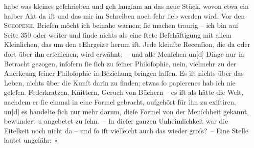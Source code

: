 \begin{ledgroupsized}[t]{13cm}
               habe was kleines geſchrieben
               und geh langſam an das neue Stück, wovon etwa ein halber Akt da iſt und das mir im Schreiben noch ſehr
               lieb werden wird.\pend
           \pstart
           {\pb}Vor den \textsc{Schopenh}. Briefen möcht ich beinahe warnen; ſie
               machen traurig – ich bin auf Seite 350 oder weiter und finde nichts als eine ſtete
               Beſchäftigung mit allem Kleinlichen, das um den »Ehrgeiz« herum iſt. Jede kleinſte
               Recenſion, die da oder dort über ihn erſchienen, wird erwähnt; – und alle Menſchen
                  un{[}d{]} Dinge nur in Betracht gezogen, inſofern ſie ſich zu
               ſeiner Philoſophie, nein, vielmehr zu der Anerke{\geminationn}ung
               ſeiner Philoſophie in Beziehung bringen laſſen. Es iſt nichts über das Leben, nichts
               über die Kunſt darin zu {\pb}finden; etwas ſo papierenes hab
               ich nie geleſen. Federkratzen, Knittern, Geruch von Büchern – es iſt als hätte die
               Welt, nachdem er ſie einmal in eine Formel gebracht, aufgehört für ihn zu exiſtiren,
                  un{[}d{]} es handelte ſich nur mehr darum, dieſe Formel von der
               Menſchheit gekannt, bewundert u angebetet zu ſehn. – In dieſer ganzen Unheimlichkeit
               war die Eitelkeit noch nicht da – und ſo iſt vielleicht auch das wieder groſs? – Eine
               Stelle lautet ungefähr: »\label{K_L00467_1v}
\end{ledgroupsized}
